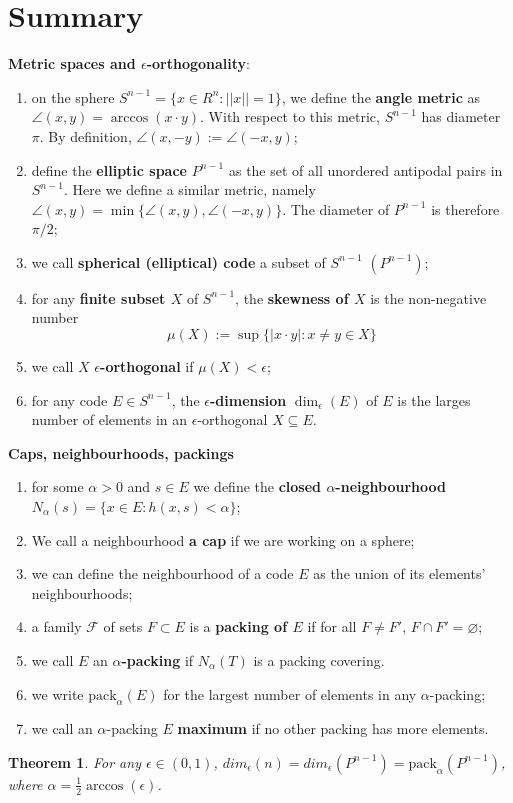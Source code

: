 \documentclass[a4paper, 10pt]{article}
\newtheorem{theorem}{Theorem}
\newcommand{\SN}{S^{n-1}}
\newcommand{\PN}{P^{n-1}}
\newcommand{\pack}{\text{pack}_{\alpha}}
\begin{document}
  \section{Summary}
  \textbf{Metric spaces and $\epsilon$-orthogonality}:
  \begin{enumerate}
    \item on the sphere $\SN = \{x \in R^n : ||x|| = 1\}$, we define the
      \textbf{angle metric} as $\angle(x,y) = \arccos(x\cdot y)$. With
      respect to this metric, $\SN$ has diameter $\pi$. 
      By definition, $\angle(x,-y) := \angle(-x,y)$;
    \item define the \textbf{elliptic space} $\PN$ as the set of all
      unordered antipodal pairs in $S^{n-1}$. Here we define a similar metric,
      namely $\angle(x,y) = \min\{\angle(x,y), \angle(-x,y) \}$. The diameter of
      $\PN$ is therefore $\pi/2$;
    \item we call \textbf{spherical (elliptical) code} a subset of $\SN$
      $(\PN)$;
    \item for any \textbf{finite subset $X$} of $\SN$, the \textbf{skewness of
      $X$} is the non-negative number
      $$ \mu(X) := \sup\{|x \cdot y| : x \neq y \in X\}$$
    \item we call $X$ \textbf{$\epsilon$-orthogonal} if $\mu(X) < \epsilon$;
    \item for any code $E \in \SN$, the \textbf{$\epsilon$-dimension}
      $\dim_{\epsilon}(E)$ of $E$ is the larges number of elements in an
      $\epsilon$-orthogonal $X \subseteq E$.
  \end{enumerate}

  \textbf{Caps, neighbourhoods, packings}
  \begin{enumerate}
    \item for some $\alpha>0$ and $s \in E$ we define the \textbf{closed
      $\alpha$-neighbourhood} $N_{\alpha}(s) = \{x\in E : h(x,s) < \alpha\}$;
    \item We call a neighbourhood \textbf{a cap} if we are working on a sphere;
    \item we can define the neighbourhood of a code $E$ as the union of its
      elements' neighbourhoods;
    \item a family $\mathcal{F}$ of sets $F \subset E$ is a \textbf{packing of
      $E$} if for all $F \neq F'$, $F \cap F' = \varnothing$;
    \item we call $E$ an \textbf{$\alpha$-packing} if $N_{\alpha}(T)$
      is a packing covering.
    \item we write $\pack(E)$ for the largest number of elements in any
      $\alpha$-packing;
    \item we call an $\alpha$-packing $E$ \textbf{maximum} if no other packing
      has more elements.
  \end{enumerate}

  \begin{theorem}
    For any $\epsilon \in (0,1)$, $dim_{\epsilon}(n) = dim_{\epsilon}(\PN) = \pack(\PN)$, where
    $\alpha = \frac{1}{2}\arccos(\epsilon)$.
  \end{theorem}
\end{document}
